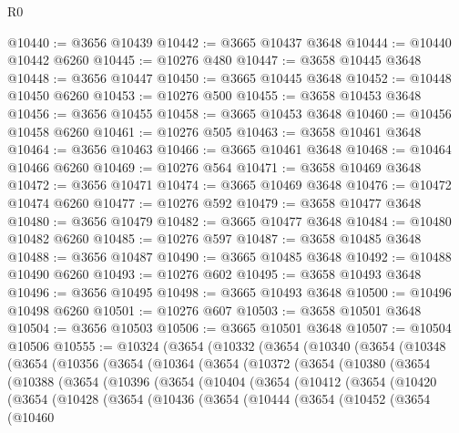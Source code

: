 \begin{lexlean}{R0}
\begin{coremodule}
@10440 := @3656 @10439
@10442 := @3665 @10437 @3648
@10444 := @10440 @10442 @6260
@10445 := @10276 @480
@10447 := @3658 @10445 @3648
@10448 := @3656 @10447
@10450 := @3665 @10445 @3648
@10452 := @10448 @10450 @6260
@10453 := @10276 @500
@10455 := @3658 @10453 @3648
@10456 := @3656 @10455
@10458 := @3665 @10453 @3648
@10460 := @10456 @10458 @6260
@10461 := @10276 @505
@10463 := @3658 @10461 @3648
@10464 := @3656 @10463
@10466 := @3665 @10461 @3648
@10468 := @10464 @10466 @6260
@10469 := @10276 @564
@10471 := @3658 @10469 @3648
@10472 := @3656 @10471
@10474 := @3665 @10469 @3648
@10476 := @10472 @10474 @6260
@10477 := @10276 @592
@10479 := @3658 @10477 @3648
@10480 := @3656 @10479
@10482 := @3665 @10477 @3648
@10484 := @10480 @10482 @6260
@10485 := @10276 @597
@10487 := @3658 @10485 @3648
@10488 := @3656 @10487
@10490 := @3665 @10485 @3648
@10492 := @10488 @10490 @6260
@10493 := @10276 @602
@10495 := @3658 @10493 @3648
@10496 := @3656 @10495
@10498 := @3665 @10493 @3648
@10500 := @10496 @10498 @6260
@10501 := @10276 @607
@10503 := @3658 @10501 @3648
@10504 := @3656 @10503
@10506 := @3665 @10501 @3648
@10507 := @10504 @10506
@10555 := @10324
    (@3654
      (@10332
        (@3654
          (@10340
            (@3654
              (@10348
                (@3654
                  (@10356
                    (@3654
                      (@10364
                        (@3654
                          (@10372
                            (@3654
                              (@10380
                                (@3654
                                  (@10388
                                    (@3654
                                      (@10396
                                        (@3654
                                          (@10404
                                            (@3654
                                              (@10412
                                                (@3654
                                                  (@10420
                                                    (@3654
                                                      (@10428
                                                        (@3654
                                                          (@10436
                                                            (@3654
                                                              (@10444
                                                                (@3654
                                                                  (@10452
                                                                    (@3654
                                                                      (@10460

\end{coremodule}
\end{lexlean}
